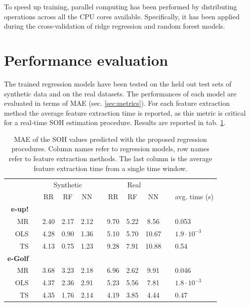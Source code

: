 To speed up training, parallel computing has been performed by distributing operations across all the CPU cores available. Specifically, it has been applied during the cross-validation of ridge regression and random forest models.



\section{Performance evaluation}
\label{sec:results}
The trained regression models have been tested on the held out test sets of synthetic data and on the real datasets. The performances of each model are evaluated in terms of MAE (sec. \ref{sec:metrics}). For each feature extraction method the average feature extraction time is reported, as this metric is critical for a real-time SOH estimation procedure. Results are reported in tab. \ref{tab:results}.

\begin{table}[hbt!]
\centering
\begin{tabular}{rcccccccccl}
\toprule
& \phantom{} & \multicolumn{3}{c}{Synthetic} & \phantom{} & \multicolumn{3}{c}{Real} & \phantom{} & \\
\cmidrule{3-5} \cmidrule{7-9}
&& RR & RF & NN && RR & RF & NN && avg. time (s)\\
\midrule
\rule{0pt}{3ex}
\textbf{e-up!}\\
\cmidrule{1-1}
MR && 2.40 & 2.17 & 2.12 && 9.70 & 5.22 & 8.56 && 0.053\\
OLS && 4.28 & 0.90 & 1.36 && 5.10 & 5.70 & 10.67 && $1.9 \cdot 10^{-3}$\\
TS && 4.13 & 0.75 & 1.23 && 9.28 & 7.91 & 10.88 && 0.54\\
\rule{0pt}{5ex}
\textbf{e-Golf}\\
\cmidrule{1-1}
MR && 3.68 & 3.23 & 2.18 && 6.96 & 2.62 & 9.91 && 0.046\\
OLS && 4.37 & 2.36 & 2.91 && 5.23 & 5.56 & 7.81 && $1.8 \cdot 10^{-3}$\\
TS && 4.35 & 1.76 & 2.14 && 4.19 & 3.85 & 4.44 && 0.47\\
\bottomrule
\end{tabular}
\caption[Results of the experiments]{MAE of the SOH values predicted with the proposed regression procedures. Column names refer to regression models, row names refer to feature extraction methods. The last column is the average feature extraction time from a single time window.}
\label{tab:results}
\end{table}


